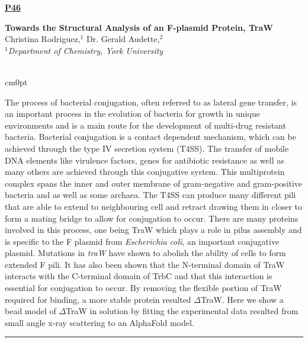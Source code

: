 \documentclass[titlepage,oneside,openany,10pt]{book}
\newenvironment{posterabswfig}[7] %
        {
	\FPeval{\cutw}{clip(16.7-#6)}
	\FPeval{\cutl}{round(#7/0.35+1,3)}
	\begin{flushright}
                \underline{\textbf{#4}}
        \end{flushright}
        \textbf{#1}\\%
        #2\\%
        \textit{#3}\\\\%
        \def\windowpagestuff{\centering
                \texttt{[image: \#5]}
	}
        \opencutright
        \begin{cutout}{0}{\cutw cm}{0pt}{\RoundingUpFunction{\cutl}}
        \noindent
	}
	{
	\end{cutout}
	\noindent\rule{15cm}{0.5pt}%
        }
\begin{document}
\begin{posterabswfig}
    {Towards the Structural Analysis of an F-plasmid Protein, TraW}
    {Christina Rodriguez,$^{1}$ Dr. Gerald Audette,$^{2}$}
    {
    $^1$Department of Chemistry, York University
    }
    {P46}
    {abstract_figures/Rodriguez_Christina_Poster.png}
    {8.0}
    {6.0}
    The process of bacterial conjugation, often referred to as lateral gene transfer, is an important process in the evolution of bacteria for growth in unique environments and is a main route for the development of multi-drug resistant bacteria. Bacterial conjugation is a contact dependent mechanism, which can be achieved through the type IV secretion system (T4SS). The transfer of mobile DNA elements like virulence factors, genes for antibiotic resistance as well as many others are achieved through this conjugative system. This multiprotein complex spans the inner and outer membrane of gram-negative and gram-positive bacteria and as well as some archaea. The T4SS can produce many different pili that are able to extend to neighbouring cell and retract drawing them in closer to form a mating bridge to allow for conjugation to occur. There are many proteins involved in this process, one being TraW which plays a role in pilus assembly and is specific to the F plasmid from \emph{Escherichia coli}, an important conjugative plasmid. Mutations in \emph{traW} have shown to abolish the ability of cells to form extended F pili. It has also been shown that the N-terminal domain of TraW interacts with the C-terminal domain of TrbC and that this interaction is essential for conjugation to occur. By removing the flexible portion of TraW required for binding, a more stable protein resulted ${\Delta}$TraW. Here we show a bead model of ${\Delta}$TraW in solution by fitting the experimental data resulted from small angle x-ray scattering to an AlphaFold model.
    \label{RodriguezC}
\end{posterabswfig}

\newpage
\end{document}
